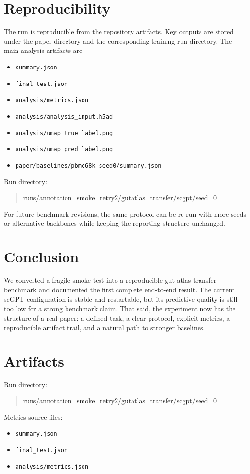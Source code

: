 \documentclass[11pt]{article}
\begin{document}
\section{Reproducibility}
The run is reproducible from the repository artifacts.
Key outputs are stored under the paper directory and the corresponding training run directory.
The main analysis artifacts are:
\begin{itemize}[leftmargin=1.2em]
  \item \texttt{summary.json}
  \item \texttt{final\_test.json}
  \item \texttt{analysis/metrics.json}
  \item \texttt{analysis/analysis\_input.h5ad}
  \item \texttt{analysis/umap\_true\_label.png}
  \item \texttt{analysis/umap\_pred\_label.png}
  \item \texttt{paper/baselines/pbmc68k\_seed0/summary.json}
\end{itemize}
Run directory:
\begin{quote}
\url{runs/annotation_smoke_retry2/gutatlas_transfer/scgpt/seed_0}
\end{quote}

For future benchmark revisions, the same protocol can be re-run with more seeds or alternative backbones while keeping the reporting structure unchanged.

\section{Conclusion}
We converted a fragile smoke test into a reproducible gut atlas transfer benchmark and documented the first complete end-to-end result.
The current scGPT configuration is stable and restartable, but its predictive quality is still too low for a strong benchmark claim.
That said, the experiment now has the structure of a real paper: a defined task, a clear protocol, explicit metrics, a reproducible artifact trail, and a natural path to stronger baselines.

\section*{Artifacts}
Run directory:
\begin{quote}
\url{runs/annotation_smoke_retry2/gutatlas_transfer/scgpt/seed_0}
\end{quote}

Metrics source files:
\begin{itemize}[leftmargin=1.2em]
  \item \texttt{summary.json}
  \item \texttt{final\_test.json}
  \item \texttt{analysis/metrics.json}
\end{itemize}
\end{document}
